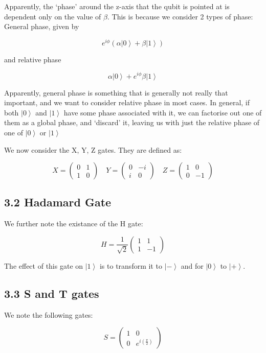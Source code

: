 \documentclass[10pt,oneside,a4paper]{article}
\newcommand{\qb}[1]{\left| #1 \right\rangle}
\begin{document}
Apparently, the `phase' around the z-axis that the qubit is pointed at is dependent only on the value of $\beta$. This is because we consider 2 types of phase: General phase, given by 

\[ 
    e^{i\phi}(\alpha \qb{0} + \beta \qb{1})
\]

and relative phase 

\[ 
    \alpha \qb{0} + e^{i\phi}\beta \qb{1}
\]

Apparently, general phase is something that is generally not really that important, and we want to consider relative phase in most cases. In general, if both $\qb{0}$ and $\qb{1}$ have some phase associated with it, we can factorise out one of them as a global phase, and `discard' it, leaving us with just the relative phase of one of $\qb{0}$ or $\qb{1}$

We now consider the X, Y, Z gates. They are defined as: 

\[
X = \begin{pmatrix} 0 & 1 \\ 1 & 0 \end{pmatrix} 
\quad 
Y = \begin{pmatrix} 0 & -i \\ i & 0 \end{pmatrix} 
\quad 
Z = \begin{pmatrix} 1 & 0 \\ 0 & -1 \end{pmatrix}
\]

\subsection*{3.2 Hadamard Gate}

We further note the existance of the H gate: 

\[
    H = \frac{1}{\sqrt{2}} \begin{pmatrix} 1 & 1 \\ 1 & -1 \end{pmatrix}
\]

The effect of this gate on $\qb{1}$ is to transform it to $\qb{-}$ and for $\qb{0}$ to  $\qb{+}$. 

\subsection*{3.3 S and T gates}

We note the following gates: 

\[
    S = \begin{pmatrix} 1 & 0 \\ 0 & e^{i \left(\frac{\pi}{2}\right)} \end{pmatrix}
\]
\end{document}
